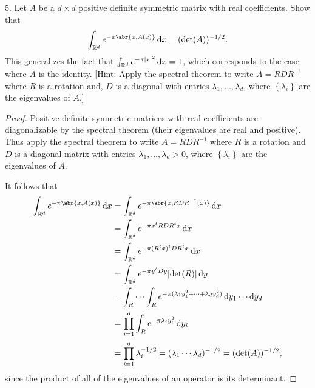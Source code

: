 \documentclass[11pt]{article}
\newcommand{\cbr}[1]{\left\{#1\right\}}
\begin{document}
5. Let $A$ be a $d\times d$ positive definite symmetric matrix with real coefficients. Show that \[\int_{\mathbb{R}^d} e^{-\pi \abr{x,A(x)}}\dd{x} = (\det(A))^{-1/2}.\] This generalizes the fact that $\int_{\mathbb{R}^d} e^{-\pi\abs{x}^2}\dd{x} = 1$, which corresponds to the case where $A$ is the identity. [Hint: Apply the spectral theorem to write $A = RDR^{-1}$ where $R$ is a rotation and, $D$ is a diagonal with entries $\lambda_1, \dots, \lambda_d$, where $\cbr{\lambda_i}$ are the eigenvalues of $A$.]
\begin{proof}
  Positive definite symmetric matrices with real coefficients are diagonalizable by the spectral theorem (their eigenvalues are real and positive). Thus apply the spectral theorem to write $A = RDR^{-1}$ where $R$ is a rotation and $D$ is a diagonal matrix with entries $\lambda_1,\dots, \lambda_d > 0$, where $\cbr{\lambda_i}$ are the eigenvalues of $A$.

  It follows that \begin{align*}
    \int_{\mathbb{R}^d} e^{-\pi \abr{x,A(x)}}\dd{x} &= \int_{\mathbb{R}^d} e^{-\pi \abr{x,RDR^{-1}(x)}}\dd{x}\\
    &= \int_{\mathbb{R}^d} e^{-\pi x^tRDR^tx}\dd{x}\\
    &= \int_{\mathbb{R}^d} e^{-\pi (R^tx)^tDR^tx}\dd{x}\\
    &= \int_{\mathbb{R}^d} e^{-\pi y^tDy}\abs{\det(R)}\dd{y}\\
    &= \int_R\cdots\int_R e^{-\pi(\lambda_1 y_1^2 + \cdots + \lambda_d y_d^2)}\dd{y_1}\cdots \dd{y_d}\\
    &= \prod_{i=1}^d \int_R e^{-\pi \lambda_iy_i^2}\dd{y_i}\\
    &= \prod_{i=1}^d \lambda_i^{-1/2} = (\lambda_1\cdots \lambda_d)^{-1/2} = (\det(A))^{-1/2},
  \end{align*} since the product of all of the eigenvalues of an operator is its determinant.
\end{proof}
\end{document}
